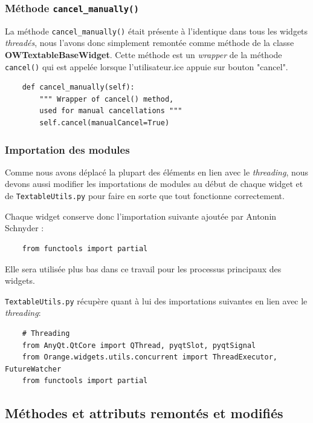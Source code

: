\documentclass{article}
\begin{document}
\subsubsection{Méthode \texttt{cancel\_manually()}}

La méthode \texttt{cancel\_manually()} était présente à l'identique dans tous les widgets \textit{threadés}, nous l'avons donc simplement remontée comme méthode de la classe \textbf{OWTextableBaseWidget}. Cette méthode est un \textit{wrapper} de la méthode \texttt{cancel()} qui est appelée lorsque l'utilisateur.ice appuie sur bouton "cancel".

\begin{verbatim}
    def cancel_manually(self):
        """ Wrapper of cancel() method,
        used for manual cancellations """
        self.cancel(manualCancel=True)
\end{verbatim}

\subsubsection{Importation des modules}

Comme nous avons déplacé la plupart des éléments en lien avec le \textit{threading}, nous devons aussi modifier les importations de modules au début de chaque widget et de \texttt{TextableUtils.py} pour faire en sorte que tout fonctionne correctement.

Chaque widget conserve donc l'importation suivante ajoutée par Antonin Schnyder : 

\begin{verbatim}
    from functools import partial
\end{verbatim}

Elle sera utilisée plus bas dans ce travail pour les processus principaux des widgets.

\texttt{TextableUtils.py} récupère quant à lui des importations suivantes en lien avec le \textit{threading}:

\begin{verbatim}
    # Threading
    from AnyQt.QtCore import QThread, pyqtSlot, pyqtSignal
    from Orange.widgets.utils.concurrent import ThreadExecutor, FutureWatcher
    from functools import partial
\end{verbatim}



\subsection{Méthodes et attributs remontés et modifiés}
\end{document}
